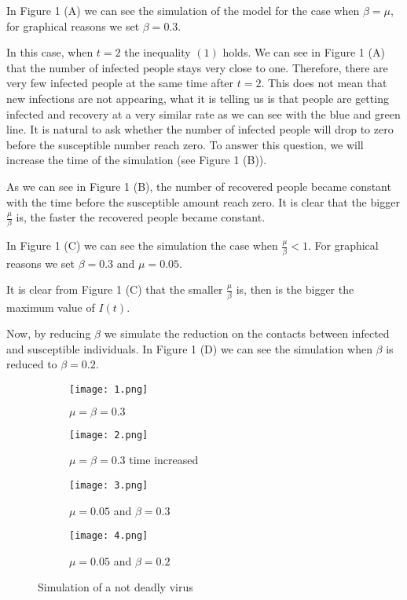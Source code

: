 \documentclass[14pt]{amsart}
\begin{document}
In Figure 1 (A) we can see the simulation of the model for the case when $\beta = \mu$, for graphical reasons we set $\beta = 0.3$.

In this case, when $t=2$ the inequality $(1)$ holds. We can see in Figure 1 (A) that the number of infected people stays very close to one. Therefore, there are very few infected people at the same time after $t=2$. This does not mean that new infections are not appearing, what it is telling us is that people are getting infected and recovery at a very similar rate as we can see with the blue and green line.
It is natural to ask whether the number of infected people will drop to zero before the susceptible number reach zero. To answer this question, we will increase the time of the simulation (see Figure 1 (B)). 

As we can see in Figure 1 (B), the number of recovered people became constant with the time before the susceptible amount reach zero. It is clear that the bigger $\frac{\mu}{\beta}$ is, the faster the recovered people became constant.

In Figure 1 (C) we can see the simulation the case when $\frac{\mu} {\beta} < 1 $. For graphical reasons we set $\beta=0.3$ and $\mu = 0.05$.

It is clear from Figure 1 (C) that the smaller $\frac{\mu}{\beta}$ is, then is the bigger the maximum value of $I(t)$.

Now, by reducing $\beta$ we simulate the reduction on the contacts between infected and susceptible individuals. In Figure 1 (D) we can see the simulation when $\beta$ is reduced to $\beta=0.2$.

\begin{figure}[h!]
  \centering
  \begin{subfigure}[b]{0.4\linewidth}
    \texttt{[image: 1.png]}
    \caption{$\mu=\beta=0.3$}
  \end{subfigure}
  \begin{subfigure}[b]{0.4\linewidth}
    \texttt{[image: 2.png]}
    \caption{$\mu=\beta=0.3$ time increased}
  \end{subfigure}
    \begin{subfigure}[b]{0.4\linewidth}
    \texttt{[image: 3.png]}
    \caption{$\mu=0.05$ and $\beta=0.3$}
  \end{subfigure}
    \begin{subfigure}[b]{0.4\linewidth}
    \texttt{[image: 4.png]}
    \caption{$\mu=0.05$ and $\beta=0.2$}
  \end{subfigure}
  \caption{Simulation of a not deadly virus}
\end{figure}
\end{document}
